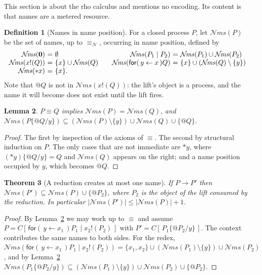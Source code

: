 \documentclass[11pt]{article}
\makeatletter
\theoremstyle{definition}
\newtheorem{definition}{Definition}[section]
\theoremstyle{plain}
\newtheorem{lemma}[definition]{Lemma}
\newtheorem{theorem}[definition]{Theorem}
\theoremstyle{remark}
\newcommand{\quo}[1]{@#1}
\newcommand{\drp}[1]{{*}#1}
\newcommand{\inp}[3]{\mathsf{for}(\,#1 \leftarrow #2\,)#3}
\newcommand{\out}[2]{#1!(#2)}
\newcommand{\nequiv}{\equiv_{\mathcal{N}}}
\newcommand{\nil}{\mathbf{0}}
\newcommand{\nms}{\mathcal{N}\!\mathit{ms}}
\makeatother
\begin{document}
This section is about the rho calculus and mentions no encoding. Its
content is that names are a metered resource.

\begin{definition}[Names in name position]
For a closed process $P$, let $\nms(P)$ be the set of names, up to
$\nequiv$, occurring in name position, defined by
\[
\begin{array}{r@{\ }c@{\ }l@{\qquad}r@{\ }c@{\ }l}
\nms(\nil) &=& \emptyset &
\nms(P_1 \mid P_2) &=& \nms(P_1) \cup \nms(P_2) \\
\nms(\out{x}{Q}) &=& \{x\} \cup \nms(Q) &
\nms(\inp{y}{x}{Q}) &=& \{x\} \cup (\nms(Q) \setminus \{y\}) \\
\nms(\drp{x}) &=& \{x\} .
\end{array}
\]
Note that $\quo{Q}$ is not in $\nms(\out{x}{Q})$: the lift's object is a
process, and the name it will become does not exist until the lift fires.
\end{definition}

\begin{lemma}\label{lem:nmscong}
$P \equiv Q$ implies $\nms(P) = \nms(Q)$, and
$\nms(P\{\quo{Q}/y\}) \subseteq (\nms(P) \setminus \{y\}) \cup \nms(Q) \cup \{\quo{Q}\}$.
\end{lemma}

\begin{proof}
The first by inspection of the axioms of $\equiv$. The second by
structural induction on $P$. The only cases that are not immediate are
$\drp{y}$, where $(\drp{y})\{\quo{Q}/y\} = Q$ and $\nms(Q)$ appears on
the right; and a name position occupied by $y$, which becomes $\quo{Q}$.
\end{proof}

\begin{theorem}[A reduction creates at most one name]\label{thm:onename}
If $P \to P'$ then $\nms(P') \subseteq \nms(P) \cup \{\quo{P_2}\}$, where
$P_2$ is the object of the lift consumed by the reduction. In particular
$|\nms(P')| \le |\nms(P)| + 1$.
\end{theorem}

\begin{proof}
By Lemma~\ref{lem:nmscong} we may work up to $\equiv$ and assume
$P = C[\,\inp{y}{x_1}{P_1} \mid \out{x_2}{P_2}\,]$ with
$P' = C[\,P_1\{\quo{P_2}/y\}\,]$. The context contributes the same names
to both sides. For the redex,
$\nms(\inp{y}{x_1}{P_1} \mid \out{x_2}{P_2}) =
 \{x_1,x_2\} \cup (\nms(P_1)\setminus\{y\}) \cup \nms(P_2)$, and by
Lemma~\ref{lem:nmscong}
$\nms(P_1\{\quo{P_2}/y\}) \subseteq (\nms(P_1)\setminus\{y\}) \cup \nms(P_2) \cup \{\quo{P_2}\}$.
\end{proof}
\end{document}
